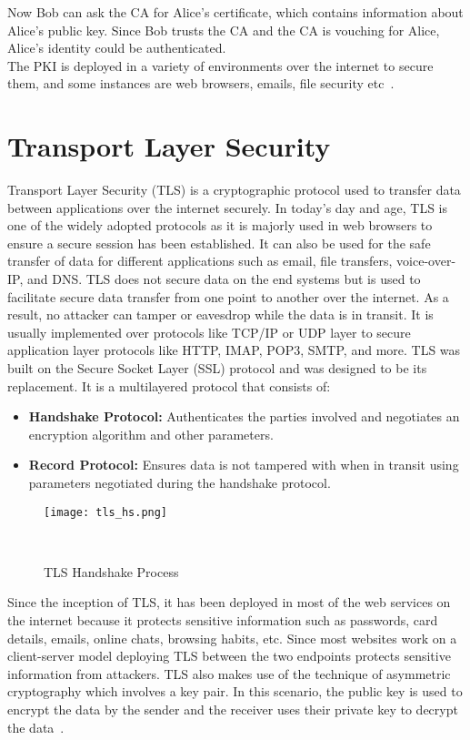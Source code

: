\noindent Now Bob can ask the CA for Alice's certificate, which contains information about Alice's public key. Since Bob trusts the CA and 
the CA is vouching for Alice, Alice's identity could be authenticated.\\
The PKI is deployed in a variety of environments over the internet to secure them, and some instances are web browsers, emails, 
file security etc~\cite{PublicKe39:online}. 

\section{Transport Layer Security}
Transport Layer Security (TLS) is a cryptographic protocol used to transfer data between applications over the internet securely. In today's day and age, 
TLS is one of the widely adopted protocols as it is majorly used in web browsers to ensure a secure session has been established. It can also be used for the safe 
transfer of data for different applications such as email, file transfers, voice-over-IP, and DNS. TLS does not secure data on the end systems but is used to 
facilitate secure data transfer from one point to another over the internet. As a result, no attacker can tamper or eavesdrop while the data is in transit. 
It is usually implemented over protocols like TCP/IP or UDP layer to secure application layer protocols like HTTP, IMAP, POP3, SMTP, and more. 
TLS was built on the Secure Socket Layer (SSL) protocol and was designed to be its replacement. It is a multilayered protocol that consists of:
\begin{itemize}
    \item \textbf{Handshake Protocol:} Authenticates the parties involved and negotiates an encryption algorithm and other parameters.
    \item \textbf{Record Protocol:} Ensures data is not tampered with when in transit using parameters negotiated during the handshake protocol.
\end{itemize}

\begin{figure}[h]
    \centering
    \texttt{[image: tls\_hs.png]}
    \caption{TLS Handshake Process}~\cite{Transpor60:online}
    \label{fig: TLS}
\end{figure}

\noindent Since the inception of TLS, it has been deployed in most of the web services on the internet because it protects sensitive information such as passwords, card details, emails, online chats,
browsing habits, etc. Since most websites work on a client-server model deploying TLS between the two endpoints protects sensitive information from attackers. TLS also makes use of the technique
of asymmetric cryptography which involves a key pair. In this scenario, the public key is used to encrypt the data by the sender and the receiver uses their private key to decrypt the data~\cite{rfc8446}.

